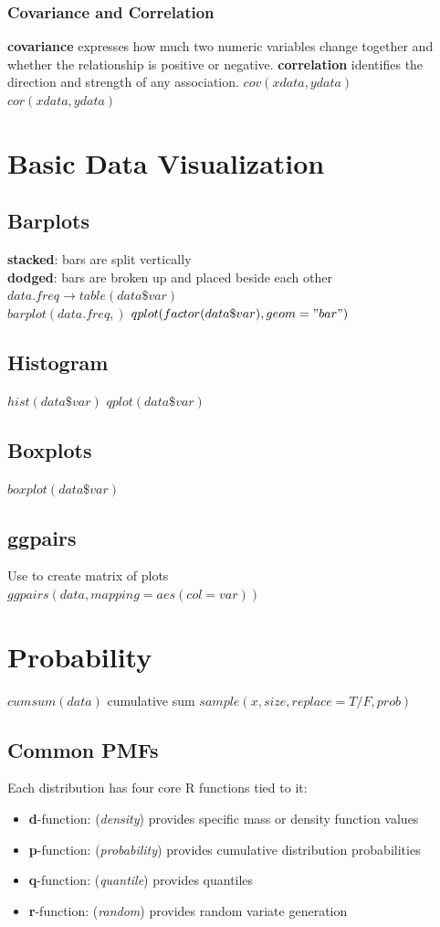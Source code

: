 \documentclass[openany]{book}
\begin{document}
\begin{flushleft}
\subsection{Covariance and Correlation}
\textbf{covariance} expresses how much two numeric variables change together and whether the relationship is positive or negative. \medbreak
\textbf{correlation} identifies the direction and strength of any association. \medbreak
$cov(xdata,ydata)$\\
$cor(xdata,ydata)$
\chapter{Basic Data Visualization}
\section{Barplots }
\textbf{stacked}: bars are split vertically \\
\textbf{dodged}: bars are broken up and placed beside each other \medbreak
$data.freq \to table(data\$var)$\\
$barplot(data.freq,)$ \medbreak
$qplot(factor(data\$var),geom="bar")$
\section{Histogram}
$hist(data\$var)$ \medbreak
$qplot(data\$var)$
\section{Boxplots}
$boxplot(data\$var)$ \medbreak
\section{ggpairs}
Use to create matrix of plots\\
$ggpairs(data,mapping=aes(col=var))$
\chapter{Probability}
$cumsum(data)$ cumulative sum \medbreak
$sample(x,size,replace=T/F,prob)$
\section{Common PMFs}
Each distribution has four core R functions tied to it:
\begin{itemize}
\item \textbf{d}-function: (\textit{density}) provides specific mass or density function values
\item \textbf{p}-function: (\textit{probability}) provides cumulative distribution probabilities
\item \textbf{q}-function: (\textit{quantile}) provides quantiles
\item \textbf{r}-function: (\textit{random}) provides random variate generation
\end{itemize}

\end{flushleft}
\end{document}
